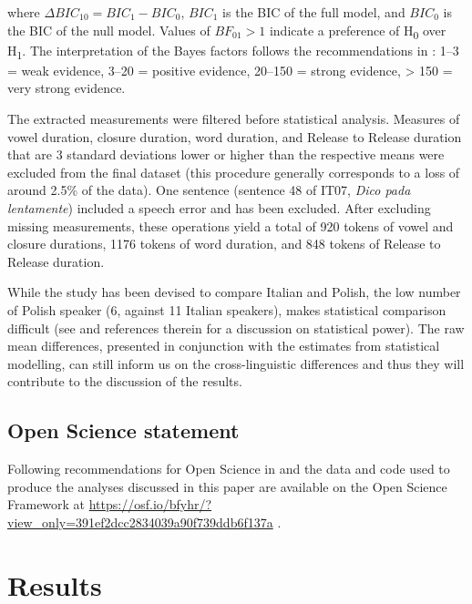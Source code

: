 \documentclass[12pt,]{article}
\begin{document}
where \(\Delta{}BIC_{10} = BIC_1 - BIC_0\), \(BIC_1\) is the BIC of the
full model, and \(BIC_0\) is the BIC of the null model. Values of
\(BF_{01} > 1\) indicate a preference of H\textsubscript{0} over
H\textsubscript{1}. The interpretation of the Bayes factors follows the
recommendations in \citet[p.~139]{raftery1995}: 1--3 = weak evidence,
3--20 = positive evidence, 20--150 = strong evidence, \textgreater{} 150
= very strong evidence.

The extracted measurements were filtered before statistical analysis.
Measures of vowel duration, closure duration, word duration, and Release
to Release duration that are 3 standard deviations lower or higher than
the respective means were excluded from the final dataset (this
procedure generally corresponds to a loss of around 2.5\% of the data).
One sentence (sentence 48 of IT07, \emph{Dico pada lentamente}) included
a speech error and has been excluded. After excluding missing
measurements, these operations yield a total of 920 tokens of vowel and
closure durations, 1176 tokens of word duration, and 848 tokens of
Release to Release duration.

While the study has been devised to compare Italian and Polish, the low
number of Polish speaker (6, against 11 Italian speakers), makes
statistical comparison difficult (see \citealt{kirby2018} and references
therein for a discussion on statistical power). The raw mean
differences, presented in conjunction with the estimates from
statistical modelling, can still inform us on the cross-linguistic
differences and thus they will contribute to the discussion of the
results.

\hypertarget{open-science-statement}{%
\subsection{Open Science statement}\label{open-science-statement}}

Following recommendations for Open Science in \citet{cruwell2018} and
\citet{berez-kroeker2018} the data and code used to produce the analyses
discussed in this paper are available on the Open Science Framework at
\url{https://osf.io/bfyhr/?view_only=391ef2dcc2834039a90f739ddb6f137a}
\citep{coretta2018g}.

\hypertarget{results}{%
\section{Results}\label{results}}
\end{document}
